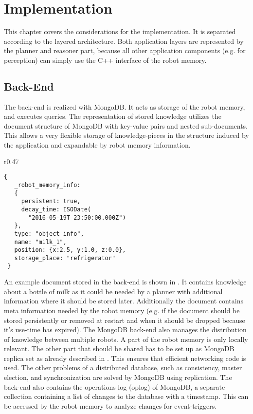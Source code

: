 \chapter{Implementation}
\label{sec:impl}
\color{gray}

This chapter covers the considerations for the implementation. It is
separated according to the layered architecture. Both application
layers are represented by the planner and reasoner part, because all
other application components (e.g. for perception) can simply use the
C++ interface of the robot memory.

\section{Back-End}
\label{sec:back-end}
The back-end is realized with MongoDB. It acts as storage of the robot
memory, and executes queries. The representation of stored knowledge
utilizes the document structure of MongoDB with key-value pairs and
nested sub-documents. This allows a very flexible storage of
knowledge-pieces in the structure induced by the application and
expandable by robot memory information.

\begin{wrapfigure}{r}{0.47\textwidth}
  \vspace{-0.8cm}
\begin{lstlisting}[style=SmallJSON,
  caption={Representation of a knowledge piece in the back-end},
  label=lst:backend,
  framexleftmargin=1pt, xleftmargin=0pt,
 morekeywords={}, numbers=none]
 {
   _robot_memory_info:
   {
     persistent: true,
     decay_time: ISODate(
       "2016-05-19T 23:50:00.000Z")
   },
   type: "object info",
   name: "milk_1",
   position: {x:2.5, y:1.0, z:0.0},
   storage_place: "refrigerator"
 }
\end{lstlisting}
\vspace{-14mm}
\end{wrapfigure}
An example document stored in the back-end is shown in
.  It contains knowledge about a bottle of milk as
it could be needed by a planner with additional information where it
should be stored later. Additionally the document contains meta
information needed by the robot memory (e.g. if the document should be
stored persistently or removed at restart and when it should be
dropped because it's use-time has expired). The MongoDB back-end also
manages the distribution of knowledge between multiple robots. A part
of the robot memory is only locally relevant. The other part that
should be shared has to be set up as MongoDB replica set as already
described in . This ensures that efficient
networking code is used. The other problems of a distributed database,
such as consistency, master election, and synchronization are solved
by MongoDB using replication. The back-end also contains the
operations log (oplog) of MongoDB, a separate
collection containing a list of changes to the database with a
timestamp. This can be accessed by the robot memory to analyze
changes for event-triggers.

